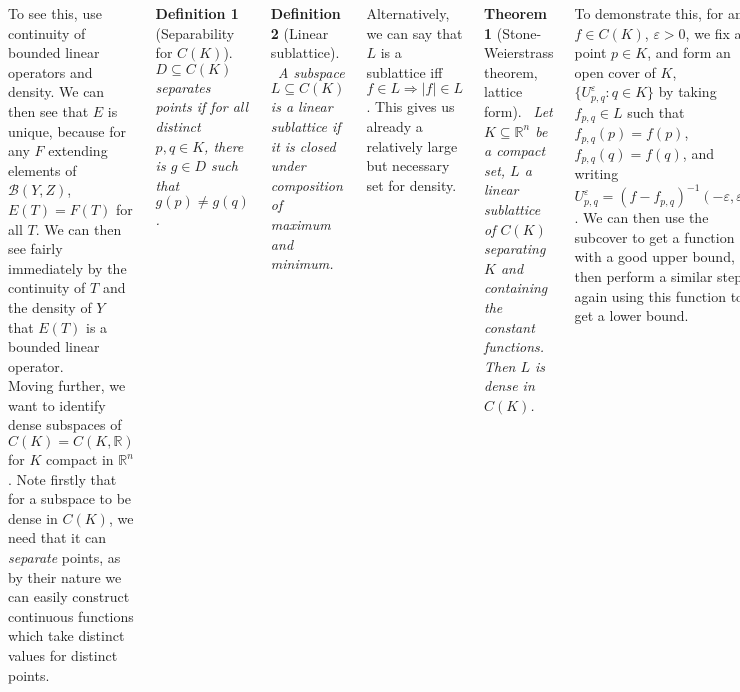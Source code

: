 \documentclass{tikzposter} %
\newtheorem{theorem}{Theorem}
\newtheorem{definition}{Definition}
\begin{document}
\begin{columns}
{    To see this, use continuity of bounded linear operators and density. We can then see that $E$ is unique, because for any $F$ extending elements of $\mathcal{B}(Y,Z)$, $E(T) = F(T)$ for all $T$. We can then see fairly immediately by the continuity of $T$ and the density of $Y$ that $E(T)$ is a bounded linear operator. \\

    Moving further, we want to identify dense subspaces of $C(K) = C(K,\mathbb{R})$ for $K$ compact in $\mathbb{R}^{n}$. Note firstly that for a subspace to be dense in $C(K)$, we need that it can \emph{separate} points, as by their nature we can easily construct continuous functions which take distinct values for distinct points. \\

    \begin{definition}[Separability for $C(K)$]
    \ $D \subseteq C(K)$ separates points if for all distinct $p,q \in K$, there is $g \in D$ such that $g(p) \neq g(q)$.
    \end{definition}
    \hphantom{}

    \begin{definition}[Linear sublattice]
    \ A subspace $L \subseteq C(K)$ is a linear sublattice if it is closed under composition of maximum and minimum.
    \end{definition}
    \hphantom{}

    Alternatively, we can say that $L$ is a sublattice iff $f \in L \Rightarrow |f| \in L$. This gives us already a relatively large but necessary set for density. \\

    \begin{theorem}[Stone-Weierstrass theorem, lattice form]
      \ Let $K \subseteq \mathbb{R}^{n}$ be a compact set, $L$ a linear sublattice of $C(K)$ separating $K$ and containing the constant functions. Then $L$ is dense in $C(K)$.
    \end{theorem}
    \hphantom{}

    To demonstrate this, for any $f \in C(K)$, $\varepsilon > 0$, we fix a point $p \in K$, and form an open cover of $K$, $\{U_{p,q}^{\varepsilon} : q \in K\}$ by taking $f_{p,q} \in L$ such that $f_{p,q}(p) = f(p)$, $f_{p,q}(q) = f(q)$, and writing $U_{p,q}^{\varepsilon} = (f-f_{p,q})^{-1}(-\varepsilon, \varepsilon)$. We can then use the subcover to get a function with a good upper bound, then perform a similar step again using this function to a get a lower bound. \\

}
\end{columns}
\end{document}
